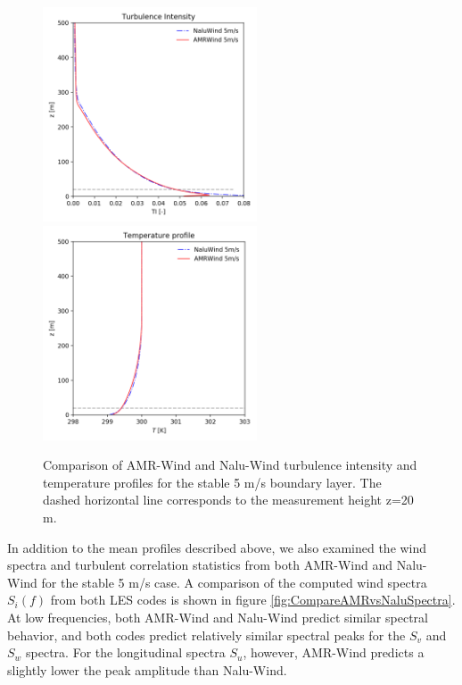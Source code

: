 \begin{figure} [hbt!]
  \centering
  \includegraphics[width=2.5in]{figures/Compare_AMRWind_NaluWind/AMRWind_NaluWind_stable_05ms_mesh2p5_2p5_2p5_TI.png}
  \includegraphics[width=2.5in]{figures/Compare_AMRWind_NaluWind/AMRWind_NaluWind_stable_05ms_mesh2p5_2p5_2p5_T.png}
  \caption{\label{fig:CompareAMRvsNaluWind_TTI} Comparison of AMR-Wind
    and Nalu-Wind turbulence intensity and temperature profiles for
    the stable 5 m/s boundary layer. The dashed horizontal line
    corresponds to the measurement height z=20 m.}
\end{figure}

In addition to the mean profiles described above, we also examined the
wind spectra and turbulent correlation statistics from both AMR-Wind
and Nalu-Wind for the stable 5 m/s case.  A comparison of the computed
wind spectra $S_i(f)$ from both LES codes is shown in figure
\ref{fig:CompareAMRvsNaluSpectra}.  At low frequencies, both AMR-Wind
and Nalu-Wind predict similar spectral behavior, and both codes
predict relatively similar spectral peaks for the $S_v$ and $S_w$
spectra.  For the longitudinal spectra $S_u$, however, AMR-Wind
predicts a slightly lower the peak amplitude than Nalu-Wind.

